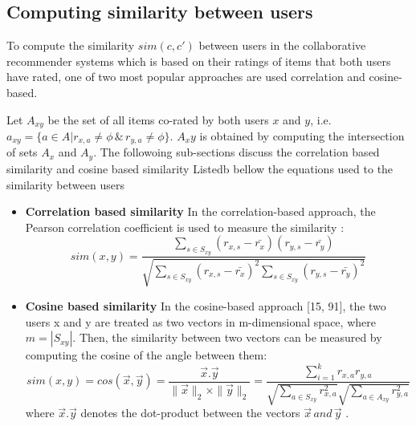 \subsection{Computing similarity between users}
To compute the similarity $sim(c,c')$ between users in the collaborative recommender systems which is based on their ratings of items that both users have rated, one of two most popular approaches are used correlation and cosine-based. 

Let $A_{xy}$ be the set of all items co-rated by both users $x$ and $y$, i.e. $a_{xy}=\{a\in A|r_{x,a}\neq \phi\, \&\, r_{y,a} \neq \phi \}$. $A_xy$ is obtained by computing the intersection of sets $A_x$ and $A_y$.
The followoing sub-sections discuss the correlation based similarity and cosine based similarity
Listedb bellow the equations used to the similarity between users
\begin{itemize}
\item \textbf{Correlation based similarity}
In the correlation-based approach, the Pearson correlation coefficient is used to measure the similarity \citep{recom_86} \citep{recom_97}:
\begin{equation}\label{eq:12}
sim(x,y)= \frac {\sum_{s\in S_{xy}}(r_{x,s}-\bar{r_x})(r_{y,s}- \bar{r_y})}{\sqrt{\sum_{s \in S_{xy}}(r_{x,s}-\bar{r_x})^2 \sum_{s\in S_{xy}}(r_{y,s}- \bar{r_y})^2}}
\end{equation}

\item \textbf{Cosine based similarity}
In the cosine-based approach [15, 91], the two users x and y are treated as two vectors in m-dimensional space, where $m=|S_{xy} |$. Then, the similarity between two vectors can be measured by computing the cosine of the angle between them:
\begin{equation}\label{eq:13}
sim(x,y)= cos(\vec{x}  ,\vec {y}) = \frac{\vec{x} . \vec {y}} {\|\vec{x}\|_2 \times \|\vec{y}\|_2 } = 
\frac{\sum _{i=1}^{k}r_{x,a}r_{y,a} }{\sqrt {\sum_{a\in S_{xy}}r^{2}_{x,a}}{\sqrt {\sum_{a\in A_{xy}}r^{2}_{y,a}}}}
\end{equation}
where $\vec{x} . \vec {y}$  denotes the dot-product between the vectors $\vec{x} \,and \,\vec {y}$ .
\end{itemize}



